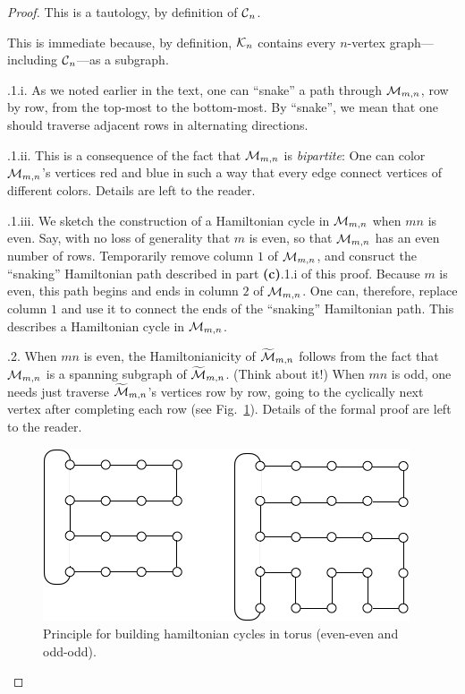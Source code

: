 \begin{proof}
This is a tautology, by definition of $\mbox{$\cal C$}_n$.

\medskip

This is immediate because, by definition, $\mbox{$\cal K$}_n$ contains every
$n$-vertex graph---including $\mbox{$\cal C$}_n$---as a subgraph.

\medskip

.1.i.
As we noted earlier in the text, one can ``snake'' a path through
$\mbox{$\cal M$}_{m,n}$, row by row, from the top-most to the bottom-most.  By
``snake'', we mean that one should traverse adjacent rows in
alternating directions.

.1.ii.
This is a consequence of the fact that $\mbox{$\cal M$}_{m,n}$ is {\it bipartite}:
 One can color $\mbox{$\cal M$}_{m,n}$'s vertices red and blue
in such a way that every edge connect vertices of different colors.
Details are left to the reader.

.1.iii.
We sketch the construction of a Hamiltonian cycle in $\mbox{$\cal M$}_{m,n}$ when
$mn$ is even.  Say, with no loss of generality that $m$ is even, so
that $\mbox{$\cal M$}_{m,n}$ has an even number of rows.  Temporarily remove column
$1$ of $\mbox{$\cal M$}_{m,n}$, and consruct the ``snaking'' Hamiltonian path
described in part {\bf (c)}.1.i of this proof.  Because $m$ is even,
this path begins and ends in column $2$ of $\mbox{$\cal M$}_{m,n}$.  One can,
therefore, replace column $1$ and use it to connect the ends of the
``snaking'' Hamiltonian path.  This describes a Hamiltonian cycle in
$\mbox{$\cal M$}_{m,n}$.

.2.
When $mn$ is even, the Hamiltonianicity of $\widetilde{\mbox{$\cal M$}}_{m,n}$
follows from the fact that $\mbox{$\cal M$}_{m,n}$ is a spanning subgraph of
$\widetilde{\mbox{$\cal M$}}_{m,n}$.  (Think about it!)  When $mn$ is odd, one
needs just traverse $\widetilde{\mbox{$\cal M$}}_{m,n}$'s vertices row by row, going
to the cyclically next vertex after completing each row (see Fig.~\ref{fig:HamiltonTorus}).  
Details of the formal proof are left to the reader.
\begin{figure}[hbt]
\begin{center}
       \includegraphics[scale=0.6]{FiguresGraph/HamiltonTorus}
       \caption{Principle for building hamiltonian cycles in torus (even-even and odd-odd).}
  \label{fig:HamiltonTorus}
\end{center}
\end{figure}
\medskip


\end{proof}
